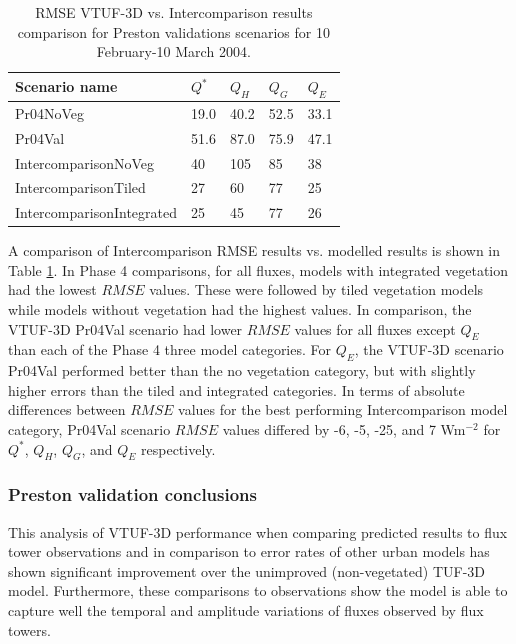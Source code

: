 \documentclass[final,3p,times,authoryear]{elsarticle}
\begin{document}
\begin{center}
\begin{table}[!htbp]
\caption{RMSE VTUF-3D vs. Intercomparison results comparison for Preston validations scenarios for 10 February-10 March 2004.\label{fig:prestonrmse}} 
\begin{tabular}{  | l | l | l|l|l| } 
\hline \textbf{Scenario name} &\textbf{$Q^{*}$}& \textbf{$Q_{H}$}& \textbf{$Q_{G}$}& \textbf{$Q_{E}$}  \\ \hline
Pr04NoVeg & 19.0&	40.2&	52.5&	33.1    \\ \hline
Pr04Val & 51.6&	87.0&	75.9&	47.1  \\ \hline	
IntercomparisonNoVeg & 40&	105&	85&	38   \\ \hline
IntercomparisonTiled &  27&	60&	77&	25  \\ \hline
IntercomparisonIntegrated & 25&	45&	77&	26   \\ \hline
  \end{tabular} 
\end{table}
\end{center} 

A comparison of Intercomparison RMSE results vs. modelled results is shown in Table \ref{fig:prestonrmse}. In Phase 4 comparisons, for all fluxes, models with integrated vegetation had the lowest $RMSE$ values. These were followed by tiled vegetation models while models without vegetation had the highest values. In comparison, the VTUF-3D Pr04Val scenario had lower $RMSE$ values for all fluxes except $Q_{E}$ than each of the Phase 4 three model categories. For $Q_{E}$, the VTUF-3D scenario Pr04Val performed better than the no vegetation category, but with slightly higher errors than the tiled and integrated categories. In terms of absolute differences between $RMSE$ values for the best performing Intercomparison model category, Pr04Val scenario $RMSE$ values differed by -6, -5, -25, and 7 Wm$^{-2}$ for $Q^{*}$, $Q_{H}$, $Q_{G}$, and $Q_{E}$ respectively.

\subsubsection{Preston validation conclusions}

This analysis of VTUF-3D performance when comparing predicted results to flux tower observations and in comparison to error rates of other urban models has shown significant improvement over the unimproved (non-vegetated) TUF-3D model. Furthermore, these comparisons to observations show the model is able to capture well the temporal and amplitude variations of fluxes observed by flux towers. 
\end{document}
